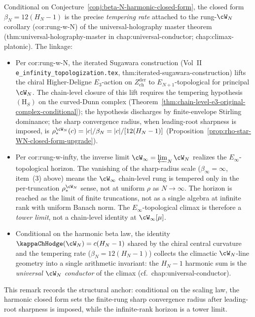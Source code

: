\begin{remark}%
\label{rem:anchor-beta-N-rung-w-N-w-infty}%
%
%
%
Conditional on Conjecture~\ref{conj:beta-N-harmonic-closed-form},
the closed form $\beta_N = 12(H_N - 1)$ is the precise
\emph{tempering rate} attached to the rung-$\cW_N$ corollary
(\textsf{cor:rung-w-N}) of the universal-holography master theorem
(\textsf{thm:universal-holography-master} in
\textsf{chap:universal-conductor}; \textsf{chap:climax-platonic}). The
linkage:
\begin{itemize}[nosep]
\item Per \textsf{cor:rung-w-N}, the iterated Sugawara construction
 (Vol~II \texttt{e\_infinity\_topologization.tex},
 \textsf{thm:iterated-sugawara-construction}) lifts the chiral
 Higher-Deligne $E_3$-action on $Z^{\mathrm{der}}_{\mathrm{ch}}$ to
 $E_{N+1}$-topological for principal $\cW_N$. The chain-level
 closure of this lift requires the tempering hypothesis
 $(\mathrm{H}_S)$ on the curved-Dunn complex
 (Theorem~\ref{thm:chain-level-e3-original-complex-conditional}); the
 hypothesis discharges by finite-envelope Stirling dominance; the sharp
 convergence radius, when leading-root sharpness is imposed, is
 $\rho_*^{\cW_N}(c) = |c|/\beta_N = |c|/[12(H_N - 1)]$
 (Proposition~\ref{prop:rho-star-WN-closed-form-upgrade}).
\item Per \textsf{cor:rung-w-infty}, the inverse limit
 $\cW_\infty = \varprojlim_N \cW_N$ realizes the $E_\infty$-topological
 horizon. The vanishing of the sharp-radius scale
 ($\beta_\infty = \infty$, item~(3) above) means the $\cW_\infty$
 chain-level rung is tempered only in the per-truncation
 $\rho_*^{\cW_N}$ sense, not at uniform $\rho$ as $N \to \infty$. The
 horizon is reached as the limit of finite truncations, not as a
 single algebra at infinite rank with uniform Banach norm. The
 $E_\infty$-topological climax is therefore a \emph{tower limit}, not
 a chain-level identity at $\cW_\infty[\mu]$.
\item Conditional on the harmonic beta law, the identity
 $\kappaChHodge(\cW_N) = c(H_N - 1)$ shared by the chiral central curvature
 and the tempering rate
 ($\beta_N = 12(H_N - 1)$) collects the climactic
 $\cW_N$-line geometry into a single arithmetic invariant: the
 $H_N - 1$ harmonic sum is the \emph{universal $\cW_N$ conductor}
 of the climax (cf.\ \textsf{chap:universal-conductor}).
\end{itemize}
This remark records the structural anchor: conditional on the scaling
law, the harmonic closed form sets the finite-rung sharp convergence
radius after leading-root sharpness is imposed, while the infinite-rank
horizon is a tower limit.
\end{remark}

